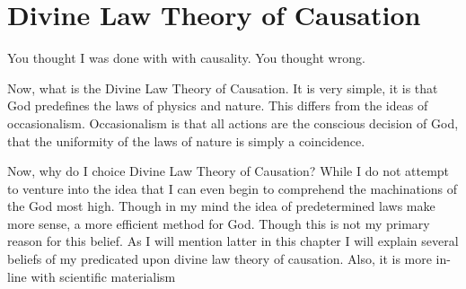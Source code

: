 \section{Divine Law Theory of Causation}
\par You thought I was done with with causality. You thought wrong.
\par Now, what is the Divine Law Theory of Causation. It is very simple, it is that God predefines the laws of physics and nature. This differs from the ideas of occasionalism. Occasionalism is that all actions are the conscious decision of God, that the uniformity of the laws of nature is simply a coincidence.
\par Now, why do I choice Divine Law Theory of Causation? While I do not attempt to venture into the idea that I can even begin to comprehend the machinations of the God most high. Though in my mind the idea of predetermined laws make more sense, a more efficient method for God. Though this is not my primary reason for this belief. As I will mention latter in this chapter I will explain several beliefs of my predicated upon divine law theory of causation. Also, it is more in-line with scientific materialism
